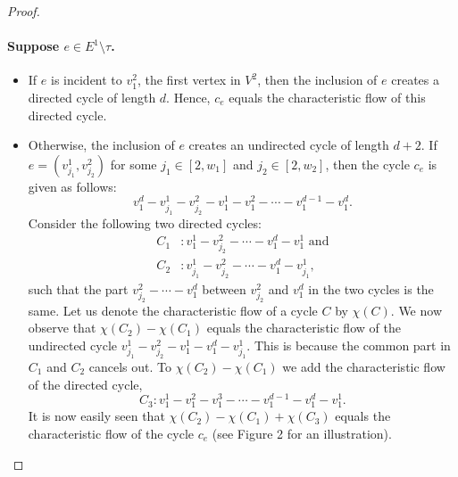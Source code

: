 \documentclass[10pt,a4paper]{article}
\newcommand{\C}{\mathbb C}
\begin{document}
\begin{proof}
\paragraph{Suppose $e\in E^1\setminus\tau$.}
\begin{itemize}
\item If $e$ is incident to $v^2_1$, the first vertex in $V^2$, then the inclusion of $e$ creates a directed cycle of length $d$. Hence, $c_e$ equals the characteristic flow of this directed cycle.
\item Otherwise, the inclusion of $e$ creates an undirected cycle of length $d+2$. If $e=(v^1_{j_1},v^2_{j_2})$ for some $j_1\in[2,w_1]$ and $j_2\in[2,w_2]$, then the cycle $c_e$ is given as follows:
\[v^d_1-v^1_{j_1}-v^2_{j_2}-v^1_1-v^2_1-\cdots-v^{d-1}_1-v^d_1.\]
Consider the following two directed cycles:
\begin{align*}C_1&:v^1_1-v^2_{j_2}-\cdots-v^d_1-v^1_1\text{ and}\\C_2&:v^1_{j_1}-v^2_{j_2}-\cdots-v^d_1-v^1_{j_1},\end{align*}
such that the part $v^2_{j_2}-\cdots-v^d_1$ between $v^2_{j_2}$ and $v^d_1$ in the two cycles is the same. Let us denote the characteristic flow of a cycle $C$ by $\chi(C)$. We now observe that $\chi(C_2)-\chi(C_1)$ equals the characteristic flow of the undirected cycle $v^1_{j_1}-v^2_{j_2}-v^1_1-v^d_1-v^1_{j_1}$. This is because the common part in $C_1$ and $C_2$ cancels out. To $\chi(C_2)-\chi(C_1)$ we add the characteristic flow of the directed cycle,
\[C_3:v^1_1-v^2_1-v^3_1-\cdots-v^{d-1}_1-v^d_1-v^1_1.\]
It is now easily seen that $\chi(C_2)-\chi(C_1)+\chi(C_3)$ equals the characteristic flow of the cycle $c_e$ (see Figure 2 for an illustration).
\end{itemize}

\end{proof}
\end{document}
